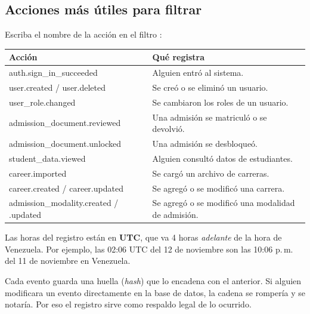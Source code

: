 \subsection{Acciones más útiles para filtrar}

Escriba el nombre de la acción en el filtro :

\begin{tabularx}{\linewidth}{@{}>{\ttfamily\small}l X@{}}
  \toprule
  \normalfont\bfseries Acción & \bfseries Qué registra \\
  \midrule
  auth.sign\_in\_succeeded        & Alguien entró al sistema. \\
  user.created / user.deleted     & Se creó o se eliminó un usuario. \\
  user\_role.changed              & Se cambiaron los roles de un usuario. \\
  admission\_document.reviewed    & Una admisión se matriculó o se devolvió. \\
  admission\_document.unlocked    & Una admisión se desbloqueó. \\
  student\_data.viewed            & Alguien consultó datos de estudiantes. \\
  career.imported                 & Se cargó un archivo de carreras. \\
  career.created / career.updated & Se agregó o se modificó una carrera. \\
  admission\_modality.created / .updated & Se agregó o se modificó una modalidad de admisión. \\
  \bottomrule
\end{tabularx}

\begin{nota}
Las horas del registro están en \textbf{UTC}, que va 4 horas \emph{adelante} de la hora de
Venezuela. Por ejemplo, las 02:06 UTC del 12 de noviembre son las 10:06 p.\,m. del 11 de
noviembre en Venezuela.
\end{nota}

\begin{importante}
Cada evento guarda una huella (\emph{hash}) que lo encadena con el anterior. Si alguien
modificara un evento directamente en la base de datos, la cadena se rompería y se notaría. Por
eso el registro sirve como respaldo legal de lo ocurrido.
\end{importante}
